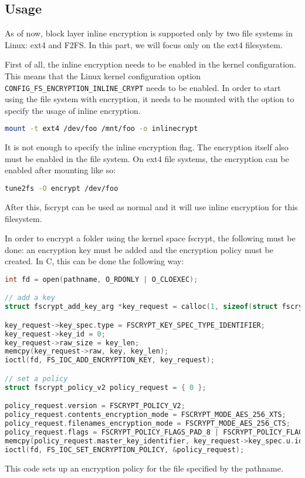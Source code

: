 
\subsection{Usage}

As of now, block layer inline encryption is supported only by two file systems in Linux: ext4 and F2FS. 
In this part, we will focus only on the ext4 filesystem.

First of all, the inline encryption needs to be enabled in the kernel configuration. This means that the Linux kernel configuration option \verb|CONFIG_FS_ENCRYPTION_INLINE_CRYPT| needs to be enabled.
In order to start using the file system with encryption, it needs to be mounted with the option to specify the usage of inline encryption. 
\begin{lstlisting}[language=bash]
mount -t ext4 /dev/foo /mnt/foo -o inlinecrypt
\end{lstlisting}
It is not enough to specify the inline encryption flag. The encryption itself also must be enabled in the file system. On ext4 file systems, the encryption can be enabled after mounting like so:
\begin{lstlisting}[language=bash]
tune2fs -O encrypt /dev/foo
\end{lstlisting}
After this, fscrypt can be used as normal and it will use inline encryption for this filesystem.

In order to encrypt a folder using the kernel space fscrypt, the following must be done: an encryption key must be added and the encryption policy must be created. In C, this can be done the following way:
\begin{lstlisting}[language=c]
int fd = open(pathname, O_RDONLY | O_CLOEXEC);

// add a key
struct fscrypt_add_key_arg *key_request = calloc(1, sizeof(struct fscrypt_add_key_arg) + key_len);

key_request->key_spec.type = FSCRYPT_KEY_SPEC_TYPE_IDENTIFIER;
key_request->key_id = 0;
key_request->raw_size = key_len;
memcpy(key_request->raw, key, key_len);
ioctl(fd, FS_IOC_ADD_ENCRYPTION_KEY, key_request);

// set a policy
struct fscrypt_policy_v2 policy_request = { 0 };

policy_request.version = FSCRYPT_POLICY_V2;
policy_request.contents_encryption_mode = FSCRYPT_MODE_AES_256_XTS;
policy_request.filenames_encryption_mode = FSCRYPT_MODE_AES_256_CTS;
policy_request.flags = FSCRYPT_POLICY_FLAGS_PAD_8 | FSCRYPT_POLICY_FLAGS_PAD_16 | FSCRYPT_POLICY_FLAGS_PAD_32;
memcpy(policy_request.master_key_identifier, key_request->key_spec.u.identifier, FSCRYPT_KEY_IDENTIFIER_SIZE);
ioctl(fd, FS_IOC_SET_ENCRYPTION_POLICY, &policy_request);
\end{lstlisting}
This code sets up an encryption policy for the file specified by the pathname. 

